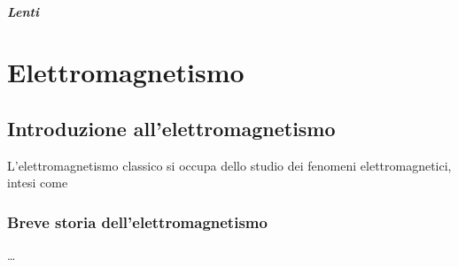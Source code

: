 \documentclass[letterpaper,10pt,italian]{jupyterBook}
\begin{document}
\subsubsection{Lenti}
\label{\detokenize{ch/waves/intro:lenti}}\label{\detokenize{ch/waves/intro:physics-hs-waves-optics-geometric-lenses}}
\sphinxstepscope


\part{Elettromagnetismo}

\sphinxstepscope


\chapter{Introduzione all’elettromagnetismo}
\label{\detokenize{ch/electromagnetism/intro:introduzione-all-elettromagnetismo}}\label{\detokenize{ch/electromagnetism/intro:physics-hs-electromagnetism-intro}}\label{\detokenize{ch/electromagnetism/intro::doc}}
\sphinxAtStartPar
L’elettromagnetismo classico si occupa dello studio dei fenomeni elettromagnetici, intesi come

\sphinxstepscope


\section{Breve storia dell’elettromagnetismo}
\label{\detokenize{ch/electromagnetism/intro-history:breve-storia-dell-elettromagnetismo}}\label{\detokenize{ch/electromagnetism/intro-history:physics-hs-electromagnetism-intro-history}}\label{\detokenize{ch/electromagnetism/intro-history::doc}}
\sphinxAtStartPar
{}
…
\end{document}
